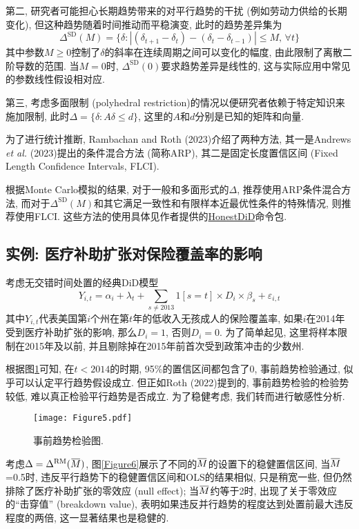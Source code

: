 \documentclass[cn,blue,14pt,screen,bibstyle=gb7714-2015]{elegantnote}
\newcommand{\overbar}[1]{\mkern 1.5mu\overline{\mkern-1.5mu#1\mkern-1.5mu}\mkern 1.5mu}
\begin{document}
第二, 研究者可能担心长期趋势带来的对平行趋势的干扰 (例如劳动力供给的长期变化), 但这种趋势随着时间推动而平稳演变, 此时的趋势差异集为
$$\Delta^\text{SD}(M)=\{\delta:|(\delta_{t+1}-\delta_t)-(\delta_{t}-\delta_{t-1})|\leq M,\,\forall t\}$$
其中参数$M\ge0$控制了$\delta$的斜率在连续周期之间可以变化的幅度, 由此限制了离散二阶导数的范围. 当$M=0$时, $\Delta^\text{SD}(0)$要求趋势差异是线性的, 这与实际应用中常见的参数线性假设相对应.

第三, 考虑多面限制 (polyhedral restriction)的情况以便研究者依赖于特定知识来施加限制, 此时$\Delta=\{\delta:A\delta\leq d\}$, 这里的$A$和$d$分别是已知的矩阵和向量.

为了进行统计推断, Rambachan and Roth (2023)介绍了两种方法, 其一是Andrews \emph{et al.} (2023)提出的条件混合方法 (简称ARP), 其二是固定长度置信区间 (Fixed Length Confidence Intervals, FLCI).

根据Monte Carlo模拟的结果, 对于一般和多面形式的$\Delta$, 推荐使用ARP条件混合方法, 而对于$\Delta^\text{SD}(M)$和其它满足一致性和有限样本近最优性条件的特殊情况, 则推荐使用FLCI. 这些方法的使用具体见作者提供的\href{https://github.com/asheshrambachan/HonestDiD}{HonestDiD}命令包.

\subsection{实例: 医疗补助扩张对保险覆盖率的影响}
考虑无交错时间处置的经典DiD模型
$$Y_{i,t}=\alpha_i+\lambda_t+\sum_{s\neq2013}1[s=t]\times D_i\times \beta_s+\varepsilon_{i,t}$$
其中$Y_{i,t}$代表美国第$i$个州在第$t$年的低收入无孩成人的保险覆盖率, 如果$i$在2014年受到医疗补助扩张的影响, 那么$D_i=1$, 否则$D_i=0$. 为了简单起见, 这里将样本限制在2015年及以前, 并且剔除掉在2015年前首次受到政策冲击的少数州.

根据图\ref{Figure5}可知, 在$t<2014$的时期, 95\%的置信区间都包含了0, 事前趋势检验通过, 似乎可以认定平行趋势假设成立. 但正如Roth (2022)提到的, 事前趋势检验的检验势较低, 难以真正检验平行趋势是否成立. 为了稳健考虑, 我们转而进行敏感性分析.
\begin{figure}
  \centering
  \texttt{[image: Figure5.pdf]}
  \caption{事前趋势检验图.}\label{Figure5}
\end{figure}

考虑$\Delta=\Delta^\text{RM}(\overbar{M})$, 图\ref{Figure6}展示了不同的$\overbar{M}$的设置下的稳健置信区间, 当$\overbar{M}$=0.5时, 违反平行趋势下的稳健置信区间和OLS的结果相似, 只是稍宽一些, 但仍然排除了医疗补助扩张的零效应 (null effect); 当$\overbar{M}$约等于2时, 出现了关于零效应的“击穿值” (breakdown value), 表明如果违反并行趋势的程度达到处置前最大违反程度的两倍, 这一显著结果也是稳健的.
\end{document}
